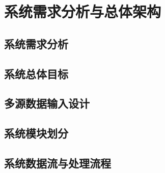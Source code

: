 
\chapter{系统需求分析与总体架构}

\section{系统需求分析}

\section{系统总体目标}

\section{多源数据输入设计}

\section{系统模块划分}

\section{系统数据流与处理流程}
